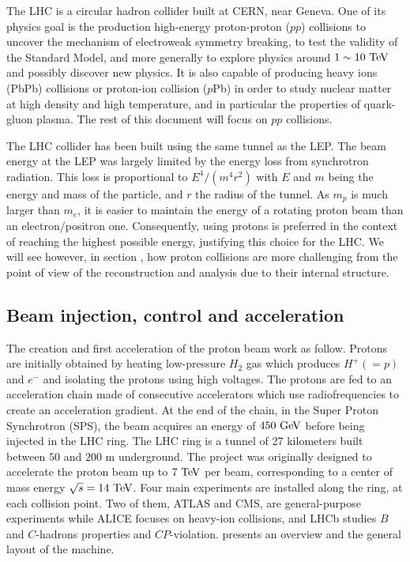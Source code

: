     The LHC \cite{LHC} is a circular hadron collider built at CERN, near Geneva. One of its physics
    goal is the production high-energy proton-proton ($pp$) collisions to uncover the mechanism
    of electroweak symmetry breaking, to test the validity of the Standard Model, and more
    generally to explore physics around $1\sim10 ~\text{TeV}$ and possibly discover new
    physics. It is also capable of producing heavy ions (PbPb) collisions or proton-ion
    collision ($p$Pb) in order to study nuclear matter at high density and high temperature,
    and in particular the properties of quark-gluon plasma. The rest of this document will
    focus on $pp$ collisions.

    The LHC collider has been built using the same tunnel as the LEP. The beam energy at
    the LEP was largely limited by the energy loss from synchrotron radiation. This loss
    is proportional to $E^4 / (m^{4} r^{2})$ with $E$ and $m$ being the energy and mass of the
    particle, and $r$ the radius of the tunnel. As $m_p$ is much larger than $m_e$, it is
    easier to maintain the energy of a rotating proton beam than an electron/positron one.
    Consequently, using protons is preferred in the context of reaching the highest possible
    energy, justifying this choice for the LHC. We will see however, in section
    , how proton collisions are more challenging
    from the point of view of the reconstruction and analysis due to their internal structure.

    \subsection{Beam injection, control and acceleration}

    The creation and first acceleration of the proton beam work as follow. Protons are initially
    obtained by heating low-pressure $H_2$ gas which produces $H^+ (= p)$ and $e^-$ and
    isolating the protons using high voltages. The protons are fed to an acceleration
    chain made of consecutive accelerators which use radiofrequencies to create an acceleration
    gradient. At the end of the chain, in the Super Proton Synchrotron (SPS), the
    beam acquires an energy of $450~\text{GeV}$ before being injected in the LHC ring. The LHC
    ring is a tunnel of 27 kilometers built between $50$ and $200$ m underground. The
    project was originally designed to accelerate the proton beam up to $7~\text{TeV}$ per beam,
    corresponding to a center of mass energy $\sqrt{s} = 14~\text{TeV}$. Four main experiments are
    installed along the ring, at each collision point. Two of them, ATLAS and CMS, are
    general-purpose experiments while ALICE focuses on heavy-ion collisions, and LHCb studies
    $B$ and $C$-hadrons properties and $CP$-violation.  presents an
    overview and the general layout of the machine.


